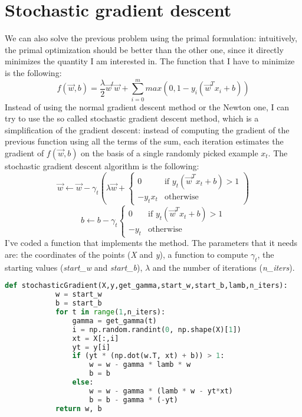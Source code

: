\section{Stochastic gradient descent}
    We can also solve the previous problem using the primal formulation: intuitively, the primal optimization should be better than the other one, since it directly minimizes the quantity I am interested in. The function that I have to minimize is the following:
    \[f(\vec{w}, b) = \frac{\lambda}{2}\vec{w}^t\vec{w} + \sum_{i=0}^{m}max(0,1-y_i(\vec{w}^Tx_i+b))\]
    Instead of using the normal gradient descent method or the Newton one, I can try to use the so called stochastic gradient descent method, which is a simplification of the gradient descent: instead of computing the gradient of the previous function using all the terms of the sum, each iteration estimates the gradient of \(f(\vec{w}, b)\) on the basis of a single randomly picked example \(x_t\). The stochastic gradient descent algorithm is the following:
    \[
        \vec{w} \leftarrow \vec{w} - \gamma_t\left(\lambda\vec{w}+
        \begin{cases}
            0       & \text{if } y_t(\vec{w}^Tx_t + b)>1 \\
            -y_tx_t & \text{otherwise}
        \end{cases}
        \right)
    \]
    \[
        b \leftarrow b - \gamma_t
        \begin{cases}
            0       & \text{if } y_t(\vec{w}^Tx_t + b)>1 \\
            -y_t & \text{otherwise}
        \end{cases}
    \]
    I've coded a function that implements the method. The parameters that it needs are: the coordinates of the points (\emph{X} and \emph{y}), a function to compute \(\gamma_t\), the starting values (\emph{start\_w} and \emph{start\_b}), \(\lambda\) and the number of iterations (\emph{n\_iters}).
    \begin{lstlisting}[language=Python]
        def stochasticGradient(X,y,get_gamma,start_w,start_b,lamb,n_iters):
            w = start_w
            b = start_b
            for t in range(1,n_iters):
                gamma = get_gamma(t)
                i = np.random.randint(0, np.shape(X)[1])
                xt = X[:,i]
                yt = y[i]
                if (yt * (np.dot(w.T, xt) + b)) > 1:
                    w = w - gamma * lamb * w
                    b = b
                else:
                    w = w - gamma * (lamb * w - yt*xt)
                    b = b - gamma * (-yt)
            return w, b
    \end{lstlisting}
